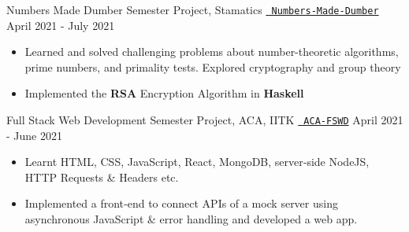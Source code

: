 \begin{cventries}
  \cventry
  {Numbers Made Dumber}
  {Semester Project, Stamatics}
  {\texttt{\href{https://github.com/abhishekshree/Numbers-Made-Dumber}{\faGithub{} Numbers-Made-Dumber}}}
  {April 2021 - July 2021}
  {
    \begin{itemize}
      \item Learned and solved challenging problems about number-theoretic algorithms, prime numbers, and primality tests. Explored cryptography and group theory
      \item Implemented the \textbf{RSA} Encryption Algorithm in \textbf{Haskell}
    \end{itemize}
  }
  \cventry
  {Full Stack Web Development}
  {Semester Project, ACA, IITK}
  {\texttt{\href{https://github.com/abhishekshree/ACA-FSWD}{\faGithub{} ACA-FSWD}}}
  {April 2021 - June 2021}
  {
    \begin{itemize}
      \item Learnt HTML, CSS, JavaScript, React, MongoDB, server‑side NodeJS, HTTP Requests \& Headers etc.
      \item Implemented a front‑end to connect APIs of a mock server using asynchronous JavaScript \& error handling and developed a web app.
    \end{itemize}
  }
\end{cventries}
\vspace{-2mm}
